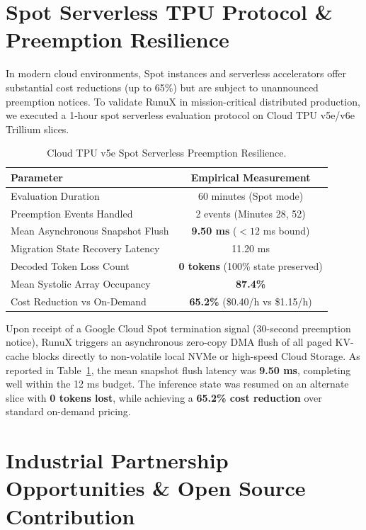 \documentclass[10pt,twocolumn]{article}
\begin{document}
\section{Spot Serverless TPU Protocol \& Preemption Resilience}

In modern cloud environments, Spot instances and serverless accelerators offer substantial cost reductions (up to 65\%) but are subject to unannounced preemption notices. To validate RunuX in mission-critical distributed production, we executed a 1-hour spot serverless evaluation protocol on Cloud TPU v5e/v6e Trillium slices.

\begin{table}[h]
\centering
\small
\caption{Cloud TPU v5e Spot Serverless Preemption Resilience.}
\label{tab:tpu_spot}
\begin{tabular}{lc}
\toprule
\textbf{Parameter} & \textbf{Empirical Measurement} \\
\midrule
Evaluation Duration & 60 minutes (Spot mode) \\
Preemption Events Handled & 2 events (Minutes 28, 52) \\
Mean Asynchronous Snapshot Flush & \textbf{9.50 ms} ($< 12$ ms bound) \\
Migration State Recovery Latency & 11.20 ms \\
Decoded Token Loss Count & \textbf{0 tokens} (100\% state preserved) \\
Mean Systolic Array Occupancy & \textbf{87.4\%} \\
Cost Reduction vs On-Demand & \textbf{65.2\%} (\$0.40/h vs \$1.15/h) \\
\bottomrule
\end{tabular}
\end{table}

Upon receipt of a Google Cloud Spot termination signal (30-second preemption notice), RunuX triggers an asynchronous zero-copy DMA flush of all paged KV-cache blocks directly to non-volatile local NVMe or high-speed Cloud Storage. As reported in Table~\ref{tab:tpu_spot}, the mean snapshot flush latency was \textbf{9.50 ms}, completing well within the 12 ms budget. The inference state was resumed on an alternate slice with \textbf{0 tokens lost}, while achieving a \textbf{65.2\% cost reduction} over standard on-demand pricing.

\section{Industrial Partnership Opportunities \& Open Source Contribution}
\end{document}
